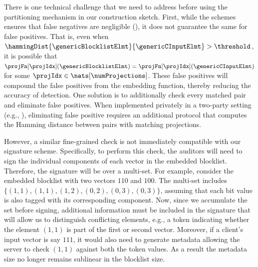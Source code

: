 
%
There is one technical challenge that we need to address before using the partitioning mechanism 
in our construction sketch. First, while the schemes ensures that false negatives 
are negligible (), it does not guarantee the same for false positives.
That is, even when $\hammingDist{\genericBlocklistElmt}{\genericCInputElmt} >
\threshold$, it is possible that   
$\projFn[\projIdx](\genericBlocklistElmt) 
= \projFn[\projIdx](\genericCInputElmt)$ for some $\projIdx \in \nats[\numProjections]$. These false 
positives will
compound the false positives from the embedding function, thereby reducing the accuracy of 
detection. One solution is to additionally check every matched pair and eliminate false 
positives. When implemented privately in a two-party setting (e.g., 
\cite{chongchitmate2024approximate}), eliminating false positive requires an additional 
protocol that computes the Hamming distance between pairs with matching 
projections. 


However, a similar fine-grained check is not immediately compatible with our signature scheme.  
Specifically, to perform this check, the auditors will need to sign the individual components of each 
vector in the embedded blocklist. Therefore, the signature will be over a multi-set. 
For example, consider the embedded blocklist with two vectors 
$110$ and $100$. The multi-set includes $\{(1,1), (1,1), (1,2), (0,2), (0,3), (0,3)\}$, assuming that 
each bit value is also tagged with its corresponding component. Now, since we accumulate the set 
before signing, additional information must be included in the signature that will allow us to 
distinguish conflicting elements, e.g., a token indicating whether the element $(1,1)$ is part of the 
first or second vector. Moreover, if a client's input vector is say $111$, it would also need to generate 
metadata allowing the server to  check $(1,1)$ against both the token values. As a result the 
metadata size no longer remains sublinear in the blocklist size. 




